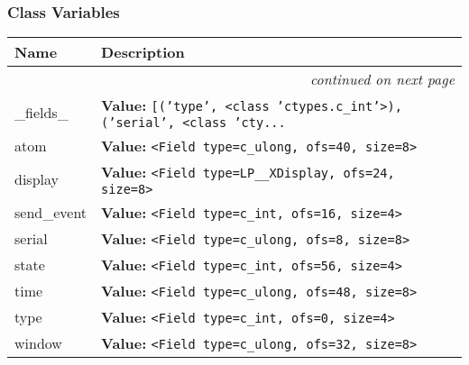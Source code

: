 
  \subsubsection{Class Variables}

    \vspace{-1cm}
\hspace{\varindent}\begin{longtable}{|p{\varnamewidth}|p{\vardescrwidth}|l}
\cline{1-2}
\cline{1-2} \centering \textbf{Name} & \centering \textbf{Description}& \\
\cline{1-2}
\endhead\cline{1-2}\multicolumn{3}{r}{\small\textit{continued on next page}}\\\endfoot\cline{1-2}
\endlastfoot\raggedright \_\-f\-i\-e\-l\-d\-s\-\_\- & \raggedright \textbf{Value:} 
{\tt \texttt{[}\texttt{(}\texttt{'}\texttt{type}\texttt{'}\texttt{, }{\textless}class 'ctypes.c\_int'{\textgreater}\texttt{)}\texttt{, }\texttt{(}\texttt{'}\texttt{serial}\texttt{'}\texttt{, }{\textless}class 'cty\texttt{...}}&\\
\cline{1-2}
\raggedright a\-t\-o\-m\- & \raggedright \textbf{Value:} 
{\tt {\textless}Field type=c\_ulong, ofs=40, size=8{\textgreater}}&\\
\cline{1-2}
\raggedright d\-i\-s\-p\-l\-a\-y\- & \raggedright \textbf{Value:} 
{\tt {\textless}Field type=LP\_\_XDisplay, ofs=24, size=8{\textgreater}}&\\
\cline{1-2}
\raggedright s\-e\-n\-d\-\_\-e\-v\-e\-n\-t\- & \raggedright \textbf{Value:} 
{\tt {\textless}Field type=c\_int, ofs=16, size=4{\textgreater}}&\\
\cline{1-2}
\raggedright s\-e\-r\-i\-a\-l\- & \raggedright \textbf{Value:} 
{\tt {\textless}Field type=c\_ulong, ofs=8, size=8{\textgreater}}&\\
\cline{1-2}
\raggedright s\-t\-a\-t\-e\- & \raggedright \textbf{Value:} 
{\tt {\textless}Field type=c\_int, ofs=56, size=4{\textgreater}}&\\
\cline{1-2}
\raggedright t\-i\-m\-e\- & \raggedright \textbf{Value:} 
{\tt {\textless}Field type=c\_ulong, ofs=48, size=8{\textgreater}}&\\
\cline{1-2}
\raggedright t\-y\-p\-e\- & \raggedright \textbf{Value:} 
{\tt {\textless}Field type=c\_int, ofs=0, size=4{\textgreater}}&\\
\cline{1-2}
\raggedright w\-i\-n\-d\-o\-w\- & \raggedright \textbf{Value:} 
{\tt {\textless}Field type=c\_ulong, ofs=32, size=8{\textgreater}}&\\
\cline{1-2}
\end{longtable}

